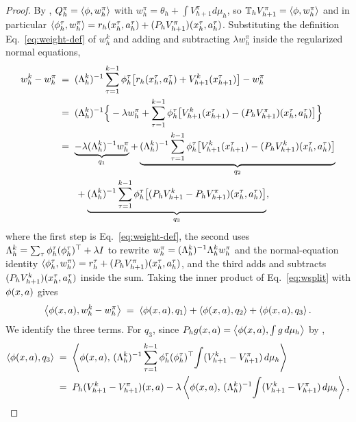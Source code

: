 \begin{proof}
By , $Q_h^\pi=\left\langle \phi, w_h^\pi \right\rangle$ with
$w_h^\pi=\theta_h+\int V_{h+1}^\pi d\mu_h$, so $\mathbb{T}_h V_{h+1}^\pi=\left\langle \phi, w_h^\pi \right\rangle$ and in particular $\left\langle \phi_h^\tau, w_h^\pi \right\rangle=r_h(x_h^\tau,
a_h^\tau)+(P_h V_{h+1}^\pi)(x_h^\tau,a_h^\tau)$. Substituting the definition
Eq.~\eqref{eq:weight-def} of $w_h^k$ and adding and subtracting $\lambda w_h^\pi$
inside the regularized normal equations,
\begin{align}
w_h^k - w_h^\pi
&\;=\; (\Lambda_h^k)^{-1}\sum_{\tau=1}^{k-1}\phi_h^\tau\big[ r_h(x_h^\tau,a_h^\tau)+V_{h+1}^k(x_{h+1}^\tau)\big] - w_h^\pi \notag \\
&\;=\; (\Lambda_h^k)^{-1}\Big\{ -\lambda w_h^\pi + \sum_{\tau=1}^{k-1}\phi_h^\tau\big[ V_{h+1}^k(x_{h+1}^\tau) - (P_h V_{h+1}^\pi)(x_h^\tau,a_h^\tau)\big]\Big\} \notag \\
&\;=\; \underbrace{-\lambda(\Lambda_h^k)^{-1}w_h^\pi}_{q_1}
+ \underbrace{(\Lambda_h^k)^{-1}\sum_{\tau=1}^{k-1}\phi_h^\tau\big[ V_{h+1}^k(x_{h+1}^\tau) - (P_h V_{h+1}^k)(x_h^\tau,a_h^\tau)\big]}_{q_2} \notag \\
&\qquad + \underbrace{(\Lambda_h^k)^{-1}\sum_{\tau=1}^{k-1}\phi_h^\tau\big[ (P_h V_{h+1}^k - P_h V_{h+1}^\pi)(x_h^\tau,a_h^\tau)\big]}_{q_3}, \label{eq:wsplit}
\end{align}
where the first step is Eq.~\eqref{eq:weight-def}, the second uses
$\Lambda_h^k=\sum_\tau\phi_h^\tau(\phi_h^\tau)^\top+\lambda I$ to rewrite
$w_h^\pi=(\Lambda_h^k)^{-1}\Lambda_h^k w_h^\pi$ and the normal-equation identity
$\left\langle \phi_h^\tau, w_h^\pi \right\rangle=r_h^\tau+(P_h V_{h+1}^\pi)(x_h^\tau,a_h^\tau)$,
and the third adds and subtracts $(P_h V_{h+1}^k)(x_h^\tau,a_h^\tau)$ inside
the sum. Taking the inner product of Eq.~\eqref{eq:wsplit} with
$\phi(x,a)$ gives
\begin{align}\label{eq:phi-w-split}
\left\langle \phi(x,a), w_h^k - w_h^\pi \right\rangle
\;=\; \left\langle \phi(x,a), q_1 \right\rangle + \left\langle \phi(x,a), q_2 \right\rangle + \left\langle \phi(x,a), q_3 \right\rangle.
\end{align}
We identify the three terms. For $q_3$, since $P_h g(x,a)=\left\langle \phi
(x,a), \int g\,d\mu_h \right\rangle$ by ,
\begin{align*}
\inner{\featmap(x,a)}{q_3}
&\;=\; \Inner{\featmap(x,a)}{(\Gram_h^k)^{-1}\sum_{\tau=1}^{k-1}\featmap_h^\tau (\featmap_h^\tau)^\top \!\int (V_{h+1}^k - V_{h+1}^\pi)\,d\mu_h} \\
&\;=\; \Pop_h(V_{h+1}^k - V_{h+1}^\pi)(x,a) - \lambda\Inner{\featmap(x,a)}{(\Gram_h^k)^{-1}\!\int (V_{h+1}^k - V_{h+1}^\pi)\,d\mu_h},

\end{align*}
\end{proof}
